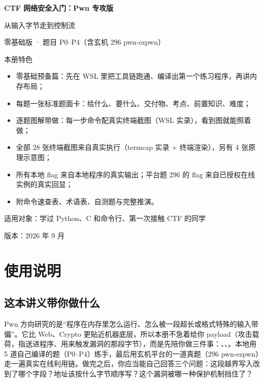 \documentclass[UTF8,12pt,oneside]{ctexbook}
\begin{document}
\frontmatter

\begin{titlepage}
\centering
\vspace*{32mm}
{\Huge\bfseries CTF 网络安全入门：Pwn 专攻版\par}
\vspace{9mm}
{\LARGE 从输入字节走到控制流\par}
\vspace{5mm}
{\large 零基础版 · 题目 P0--P4（含玄机 296 pwn-ezpwn）\par}
\vspace{14mm}
{\large 本册特色\par}
\vspace{3mm}
\begin{minipage}{0.86\linewidth}
\begin{itemize}
\item 零基础预备篇：先在 WSL 里把工具链跑通、编译出第一个练习程序，再讲内存布局；
\item 每题一张标准题面卡：给什么、要什么、交付物、考点、前置知识、难度；
\item 逐题图解带做：每一步命令配真实终端截图（WSL 实录），看到图就能照着做；
\item 全部 28 张终端截图来自真实执行（termcap 实录 + 终端渲染），另有 4 张原理示意图；
\item 所有本地 flag 来自本地程序的真实输出；平台题 296 的 flag 来自已授权在线实例的真实回显；
\item 附命令速查表、术语表、自测题与完整推演。
\end{itemize}
\end{minipage}
\vfill
{\large 适用对象：学过 Python、C 和命令行、第一次接触 CTF 的同学\par}
\vspace{4mm}
{\large 版本：2026 年 9 月\par}
\end{titlepage}

\chapter*{使用说明}

\section*{这本讲义带你做什么}
Pwn 方向研究的是“程序在内存里怎么运行、怎么被一段超长或格式特殊的输入带偏”。它比 Web、Crypto 更贴近机器底层，所以本册不急着给你 payload（攻击载荷，指送进程序、用来触发漏洞的那段字节），而是先陪你做三件事：、、。本地用 5 道自己编译的题（P0--P4）练手，最后用玄机平台的一道真题（296 pwn-ezpwn）走一遍真实在线利用链。做完之后，你应当能自己回答三个问题：这段越界写入改到了哪个字段？地址该按什么字节顺序写？这个漏洞被哪一种保护机制挡住了？
\end{document}
